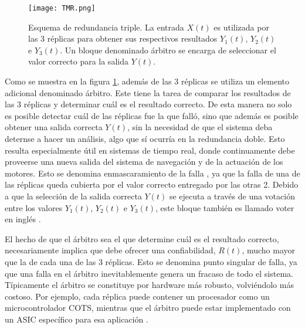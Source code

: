\begin{figure}[H]
    \centering
    \texttt{[image: TMR.png]}
    \caption{Esquema de redundancia triple. La entrada $X(t)$ es utilizada por las 3 réplicas para obtener sus respectivos resultados $Y_1(t)$, $Y_2(t)$ e $Y_3(t)$. Un bloque denominado árbitro se encarga de seleccionar el valor correcto para la salida $Y(t)$.}
    \label{fig:TMR}
\end{figure}



Como se muestra en la figura \ref{fig:TMR}, además de las 3 réplicas se utiliza un elemento adicional denominado árbitro. Este tiene la tarea de comparar los resultados de las 3 réplicas y determinar cuál es el resultado correcto. De esta manera no solo es posible detectar cuál de las réplicas fue la que falló, sino que además es posible obtener una salida correcta $Y(t)$, sin la necesidad de que el sistema deba deternse a hacer un análisis, algo que sí ocurría en la redundancia doble. Esto resulta especialmente útil en sistemas de tiempo real, donde continuamente debe proveerse una nueva salida del sistema de navegación y de la actuación de los motores. Esto se denomina enmascaramiento de la falla \cite{nelson1990fault}, ya que la falla de una de las réplicas queda cubierta por el valor correcto entregado por las otras 2. Debido a que la selección de la salida correcta $Y(t)$ se ejecuta a través de una votación entre los valores $Y_1(t)$, $Y_2(t)$ e $Y_3(t)$, este bloque también es llamado voter en inglés \cite{lyons1962use}.

El hecho de que el árbitro sea el que determine cuál es el resultado correcto, necesariamente implica que debe ofrecer una confiabilidad, $R(t)$, mucho mayor que la de cada una de las 3 réplicas. Esto se denomina punto singular de falla, ya que una falla en el árbitro inevitablemente genera un fracaso de todo el sistema. Típicamente el árbitro se constituye por hardware más robusto, volviéndolo más costoso. Por ejemplo, cada réplica puede contener un procesador como un microcontrolador COTS, mientras que el árbitro puede estar implementado con un ASIC específico para esa aplicación \cite{hiergeist2017internal}.

